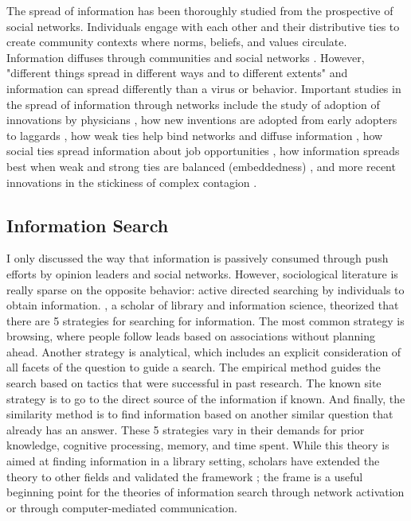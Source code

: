 The spread of information has been thoroughly studied from the prospective
of social networks. Individuals engage with each other and their distributive
ties to create community contexts where norms, beliefs, and values circulate.
Information diffuses through communities and social networks
\citep{fowler2010cooperative, bond_etal12, klarEffectNetworkStructure2017}.
However, "different things spread in different ways and to different extents"
\citep[p. 563]{christakisSocialContagionTheory2013} and information can spread
differently than a virus or behavior. Important studies in the spread of
information through networks include the study of adoption of innovations by
physicians \citep{colemanDiffusionInnovationPhysicians1957}, how new inventions
are adopted from early adopters to laggards
\citep{rogersDiffusionInnovations1962}, how weak ties help bind networks and
diffuse information \citep{granovetterStrengthWeakTies1973}, how social ties
spread information about job opportunities
\citep{granovetterGettingJobStudy1995, montgomeryJobSearchNetwork1992}, how
information spreads best when weak and strong ties are balanced (embeddedness)
\citep{uzziSocialStructureCompetition1997}, and more recent innovations in the
stickiness of complex contagion \citep{centolaComplexContagionsWeakness2007}.

\subsection{Information Search}
I only discussed the way that information is passively
consumed through push efforts by opinion leaders and social networks. However,
sociological literature is really sparse on the opposite behavior: active
directed searching by individuals to obtain information.
\citep{pejtersenDesignComputeraidedUsersystem1984}, a scholar of library and
information science, theorized that there are 5 strategies for searching for
information. The most common strategy is browsing, where people follow leads
based on associations without planning ahead. Another strategy is analytical,
which includes an explicit consideration of all facets of the question to guide
a search. The empirical method guides the search based on tactics that were
successful in past research. The known site strategy is to go to the direct
source of the information if known. And finally, the similarity method is to
find information based on another similar question that already has an answer.
These 5 strategies vary in their demands for prior knowledge, cognitive
processing, memory, and time spent. While this theory is aimed at finding
information in a library setting, scholars have extended the theory to other
fields and validated the framework \citep{fidelHumanInformationInteraction2012};
the frame is a useful beginning point for the theories of information search
through network activation or through computer-mediated communication.

